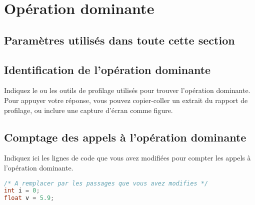 
\section{Opération dominante}

\subsection{Paramètres utilisés dans toute cette section}

\subsection{Identification de l'opération dominante}
Indiquez le ou les outils de profilage utilisés pour trouver l'opération dominante. Pour appuyer votre réponse, vous pouvez copier-coller un extrait du rapport de profilage, ou inclure une capture d'écran comme figure.

\subsection{Comptage des appels à l'opération dominante}
Indiquez ici les lignes de code que vous avez modifiées pour compter les appels à l'opération dominante.

\begin{lstlisting}[language=C]
/* A remplacer par les passages que vous avez modifies */
int i = 0;
float v = 5.9;
\end{lstlisting}

